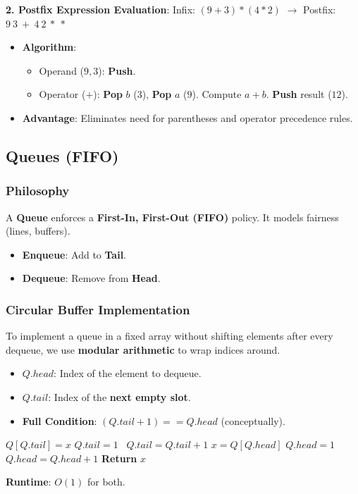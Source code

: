 \documentclass[12pt]{article}
\theoremstyle{blueplain}
\theoremstyle{bluedef}
\theoremstyle{blueremark}
\begin{document}
\textbf{2. Postfix Expression Evaluation}:
Infix: $(9+3) * (4*2)$ $\rightarrow$ Postfix: $9 \ 3 \ + \ 4 \ 2 \ * \ *$
\begin{itemize}
    \item \textbf{Algorithm}:
          \begin{itemize}
              \item Operand ($9, 3$): \textbf{Push}.
              \item Operator ($+$): \textbf{Pop} $b$ ($3$), \textbf{Pop} $a$ ($9$). Compute $a+b$. \textbf{Push} result ($12$).
          \end{itemize}
    \item \textbf{Advantage}: Eliminates need for parentheses and operator precedence rules.
\end{itemize}

\subsection{Queues (FIFO)}

\subsubsection{Philosophy}
A \textbf{Queue} enforces a \textbf{First-In, First-Out (FIFO)} policy. It models fairness (lines, buffers).
\begin{itemize}
    \item \textbf{Enqueue}: Add to \textbf{Tail}.
    \item \textbf{Dequeue}: Remove from \textbf{Head}.
\end{itemize}

\subsubsection{Circular Buffer Implementation}
To implement a queue in a fixed array without shifting elements after every dequeue, we use \textbf{modular arithmetic} to wrap indices around.
\begin{itemize}
    \item $Q.head$: Index of the element to dequeue.
    \item $Q.tail$: Index of the \textbf{next empty slot}.
    \item \textbf{Full Condition}: $(Q.tail + 1) == Q.head$ (conceptually).
\end{itemize}

\begin{algorithm}
    \caption{Queue Operations}\label{alg:queue}
    \begin{algorithmic}[1]
        \State $Q[Q.tail] = x$
         $Q.tail = 1$ 
        \Else \ $Q.tail = Q.tail + 1$
        \EndIf
        \EndProcedure
        \Statex
        \State $x = Q[Q.head]$
         $Q.head = 1$ 
        \Else \ $Q.head = Q.head + 1$
        \EndIf
        \State \textbf{Return} $x$
        \EndProcedure
    \end{algorithmic}
\end{algorithm}
\textbf{Runtime}: $O(1)$ for both.
\end{document}

